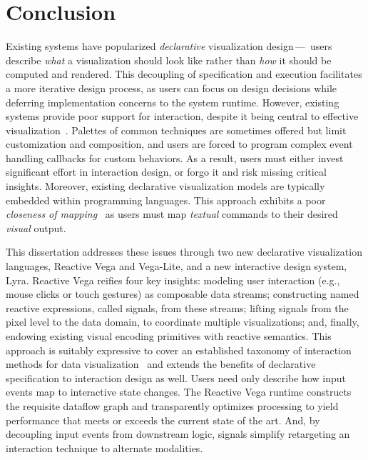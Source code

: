\chapter{Conclusion}
\label{sec:conclusion}

Existing systems have popularized \emph{declarative} visualization design\,---\,
users describe \emph{what} a visualization should look like rather than
\emph{how} it should be computed and rendered. This decoupling of specification
and execution facilitates a more iterative design process, as users can focus on
design decisions while deferring implementation concerns to the system runtime.
However, existing systems provide poor support for interaction, despite it being
central to effective
visualization~\cite{pike:interactionscience,yi:understanding}. Palettes of
common techniques are sometimes offered but limit customization and composition,
and users are forced to program complex event handling callbacks for custom
behaviors. As a result, users must either invest significant effort in
interaction design, or forgo it and risk missing critical insights. Moreover,
existing declarative visualization models are typically embedded within
programming languages. This approach exhibits a poor \emph{closeness of
mapping}~\cite{blackwell:cogdim} as users must map \emph{textual} commands to
their desired \emph{visual} output.

This dissertation addresses these issues through two new declarative
visualization languages, Reactive Vega and Vega-Lite, and a new interactive
design system, Lyra. Reactive Vega reifies four key insights: modeling user
interaction (e.g., mouse clicks or touch gestures) as composable data streams;
constructing named reactive expressions, called signals, from these streams;
lifting signals from the pixel level to the data domain, to coordinate multiple
visualizations; and, finally, endowing existing visual encoding primitives with
reactive semantics. This approach is suitably expressive to cover an established
taxonomy of interaction methods for data visualization~\cite{yi:understanding}
and extends the benefits of declarative specification to interaction design as
well. Users need only describe how input events map to interactive state
changes. The Reactive Vega runtime constructs the requisite dataflow graph and
transparently optimizes processing to yield performance that meets or exceeds
the current state of the art. And, by decoupling input events from downstream
logic, signals simplify retargeting an interaction technique to alternate
modalities.

